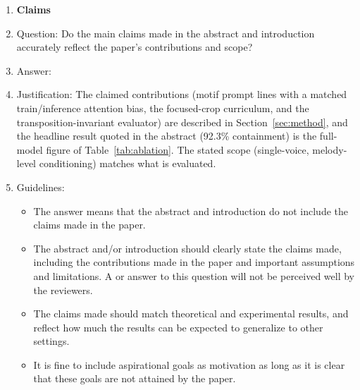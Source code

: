 \documentclass{article}
\begin{document}


\begin{enumerate}

\item {\bf Claims}
    \item[] Question: Do the main claims made in the abstract and introduction accurately reflect the paper's contributions and scope?
    \item[] Answer: \answerYes{}
    \item[] Justification: The claimed contributions (motif prompt lines with a matched train/inference attention bias, the focused-crop curriculum, and the transposition-invariant evaluator) are described in Section~\ref{sec:method}, and the headline result quoted in the abstract (92.3\% containment) is the full-model figure of Table~\ref{tab:ablation}. The stated scope (single-voice, melody-level conditioning) matches what is evaluated.
    \item[] Guidelines:
    \begin{itemize}
        \item The answer \answerNA{} means that the abstract and introduction do not include the claims made in the paper.
        \item The abstract and/or introduction should clearly state the claims made, including the contributions made in the paper and important assumptions and limitations. A \answerNo{} or \answerNA{} answer to this question will not be perceived well by the reviewers. 
        \item The claims made should match theoretical and experimental results, and reflect how much the results can be expected to generalize to other settings. 
        \item It is fine to include aspirational goals as motivation as long as it is clear that these goals are not attained by the paper. 
    \end{itemize}


\end{enumerate}
\end{document}
